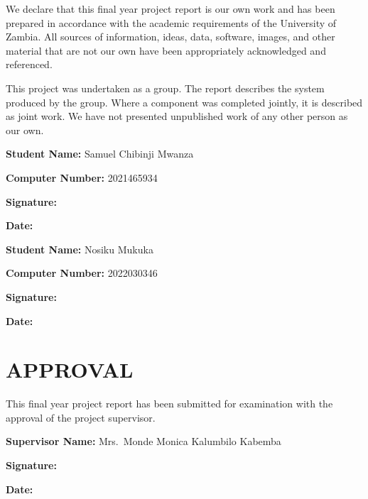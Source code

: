 \documentclass[12pt,a4paper]{report}
\begin{document}
We declare that this final year project report is our own work and has been prepared in accordance with the academic requirements of the University of Zambia. All sources of information, ideas, data, software, images, and other material that are not our own have been appropriately acknowledged and referenced.

This project was undertaken as a group. The report describes the system produced by the group. Where a component was completed jointly, it is described as joint work. We have not presented unpublished work of any other person as our own.

\vspace{1cm}
\noindent\textbf{Student Name:} Samuel Chibinji Mwanza

\vspace{0.5cm}
\noindent\textbf{Computer Number:} 2021465934

\vspace{0.5cm}
\noindent\textbf{Signature:} \hrulefill

\vspace{0.5cm}
\noindent\textbf{Date:} \hrulefill

\vspace{1cm}
\noindent\textbf{Student Name:} Nosiku Mukuka

\vspace{0.5cm}
\noindent\textbf{Computer Number:} 2022030346

\vspace{0.5cm}
\noindent\textbf{Signature:} \hrulefill

\vspace{0.5cm}
\noindent\textbf{Date:} \hrulefill

\clearpage

\chapter*{APPROVAL}

This final year project report has been submitted for examination with the approval of the project supervisor.

\vspace{1cm}
\noindent\textbf{Supervisor Name:} Mrs.\ Monde Monica Kalumbilo Kabemba

\vspace{0.5cm}
\noindent\textbf{Signature:} \hrulefill

\vspace{0.5cm}
\noindent\textbf{Date:} \hrulefill
\end{document}
